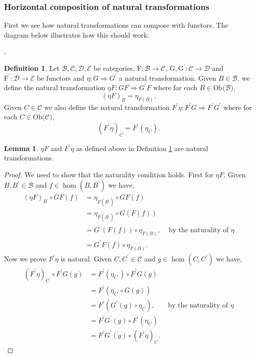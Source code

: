 \documentclass[11pt,a4paper]{article}
\theoremstyle{definition}
\newtheorem{lemma}[thm]{Lemma}
\newtheorem{definition}[thm]{Definition}
\newcommand\ho[3][]{\hom_{#1}(#2,#3)}
\newcommand\ob[1]{\mathrm{Ob(}#1\mathrm{)}}
\newcommand\cat[1]{\mathscr{#1}}
\newcommand\func[3]{\mathrm{#1}\colon#2\rightarrow#3}
\newcommand\nattran[3]{#1\colon#2\Rightarrow#3}
\numberwithin{equation}{section}
\begin{document}
\subsubsection{Horizontal composition of natural transformations}
\label{sss:horizcompnaturaltransformations} 
First we see how natural transformations can compose with functors. The diagram below illustrates how this should work.
\begin{center}
.
\end{center}
\begin{definition}
    \label{def:natcompfunc}
    Let $\cat{B,C,D,E}$ be categories, $\func{F}{\cat{B}}{\cat{C}}$, $\func{G,G^{\prime}}{\cat{C}}{\cat{D}}$ and $\func{F^\prime}{\cat{D}}{\cat{E}}$ be functors and $\nattran{\eta}{G}{G^\prime}$ a natural transformation. Given $B\in\cat{B}$, we define the natural transformation $\nattran{\eta F}{GF}{G^\prime F}$ where for each $B\in\ob{\cat{B}}$,
    \[(\eta F)_B = \eta_{F(B)}.\]
    Given $C\in\cat{C}$ we also define the natural transformation $\nattran{F^{\prime}\eta}{F^\prime G}{F^\prime G^\prime}$ where for each $C\in\ob{\cat{C}}$,
    \[(F^{\prime}\eta)_{C} = F^\prime(\eta_{C}).\]
\end{definition}
\begin{lemma}
\label{lem:natcompfunc}
$\eta F$ and $F^{\prime}\eta$ as defined above in Definition \ref{def:natcompfunc} are natural transformations.
\end{lemma}
\begin{proof}
    We need to show that the naturality condition holds. First for $\eta F$. Given $B,B^\prime\in\cat{B}$ and $f\in\ho{B}{B^\prime}$ we have,
    \begin{align*}
    (\eta F)_{B^\prime}\circ GF(f) &= \eta_{F(B^\prime)}\circ GF(f)\\
    &= \eta_{F(B^\prime)}\circ G(F(f))\\
    &= G^\prime(F(f))\circ\eta_{F(B)}, &\text{ by the naturality of $\eta$}\\
    &= G^\prime F(f)\circ\eta_{F(B)}.
    \end{align*}
    Now we prove $F^\prime\eta$ is natural. Given $C,C^\prime\in\cat{C}$ and $g\in\ho{C}{C^\prime}$ we have,
    \begin{align*}
        (F^\prime \eta)_{C^\prime}\circ F^\prime G(g) &= F^\prime(\eta_{C^\prime})\circ F^\prime G(g)\\
        &= F^\prime (\eta_{C^\prime}\circ G(g))\\
        &= F^\prime(G^\prime(g)\circ\eta_{C}), &\text{ by the naturality of $\eta$}\\
        &= F^\prime G^\prime(g)\circ F^\prime(\eta_{C})\\
        &= F^\prime G^\prime(g)\circ(F^{\prime}\eta)_{C}.
    \end{align*}
\end{proof}
\end{document}
